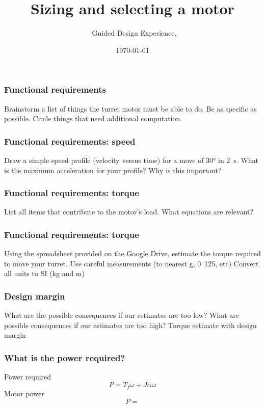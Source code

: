 \documentclass[aspectratio=169]{beamer}
\title{Sizing and selecting a motor}
\subtitle{\usnaCourseNumber\ Guided Design Experience, \usnaCourseTerm}
\author{\usnaInstructorShort}
\date{\today}
\begin{document}
\settitlebg
\begin{frame}
\titlepage
\end{frame}

\setslidebg
\begin{frame}
\frametitle{Functional requirements}
Brainstorm a list of things the turret motor must be able to do. 
Be as specific as possible.
Circle things that need additional computation.
\end{frame}

\begin{frame}
\frametitle{Functional requirements: speed}
Draw a simple speed profile (velocity versus time) for a move of \ang{30} in \SI{2}{\second}. What is the maximum acceleration for your profile? Why is this important? 
\end{frame}

\begin{frame}
\frametitle{Functional requirements: torque}
List all items that contribute to the motor's load. What equations are relevant? 
\end{frame}

\begin{frame}
\frametitle{Functional requirements: torque}
Using the spreadsheet provided on the Google Drive, estimate the torque required to move your turret. 
Use careful measurements (to nearest \si{\gram}, \si{0.125}{\inch}, etc)
Convert all units to SI (\si{\kilo\gram} and \si{\meter})
\end{frame}

\begin{frame}
\frametitle{Design margin}
What are the possible consequences if our estimates are too low?
What are possible consequences if our estimates are too high?
Torque estimate with design margin
\end{frame}

\begin{frame}
\frametitle{What is the power required?}
Power required
\begin{equation}
P = T_f\omega + J\alpha\omega
\end{equation}
Motor power
\begin{equation}
P = 
\end{equation}
\end{frame}
\end{document}
